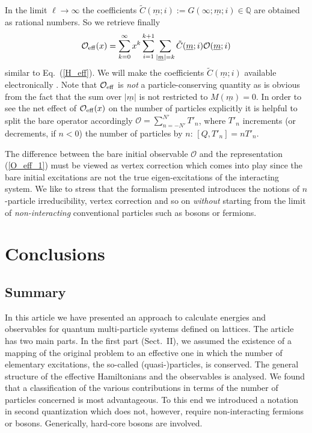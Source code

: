 In the limit $\ell\rightarrow\infty$ the coefficients
$\tilde{C}(\underline{m};i):=G(\infty;\underline{m};i)\in\mathbb Q$
 are obtained as rational numbers. So we retrieve finally
\begin{equation}
  \label{O_eff_1}
  {\mathcal O_{\rm eff}}(x) = \sum_{k=0}^{\infty}x^k\sum_{i=1}^{k+1}
  \sum_{|\underline{m}|=k}  \tilde{C}(\underline{m};i){\mathcal
  O}(\underline{m};i)
\end{equation} 
similar to Eq.~(\ref{H_eff}).
We will make the coefficients $\tilde{C}(\underline{m};i)$
available electronically \cite{notiz1}. Note that ${\mathcal O}_{\rm eff}$ is
{\it not} a  particle-conserving quantity as is obvious from
the fact that the sum over $|\underline{m}|$ is not restricted to
$M(\underline{m})=0$. In order to see the net effect of 
${\mathcal O_{\rm eff}}(x)$ on the number of particles explicitly
it is helpful to split the bare operator accordingly 
${\mathcal O}=\sum_{n=-N'}^{N'}T'_n$, where $T'_n$ increments (or decrements, 
if $n<0$) the number of particles by $n$: $[Q,T'_n]=nT'_n$.


The difference between the bare initial observable
${\mathcal O}$ and the representation (\ref{O_eff_1}) must be viewed
as vertex correction which comes into play since the bare initial excitations
are not the true eigen-excitations of the interacting system.
We like to stress that the formalism presented introduces the
notions of $n$-particle irreducibility, vertex correction and so on
{\it without} starting from the limit of {\it non-interacting}
 conventional particles such as bosons or fermions. 

\section{Conclusions} 
\subsection{Summary}
In this article we have presented an approach  to
calculate energies and observables for quantum multi-particle systems
defined on lattices. The article has two main parts. In the
first part (Sect.\ II), we assumed the existence of a mapping 
of the original problem to an effective one in which the number
of elementary excitations, the so-called (quasi-)particles,
is conserved. The general structure of the effective Hamiltonians
and the observables is analysed. We found that a classification
of the various contributions in terms of the number of particles
concerned is most advantageous. To this end we introduced a
notation in second quantization which does not, however, require
non-interacting fermions or bosons. Generically, hard-core bosons
are involved. 

